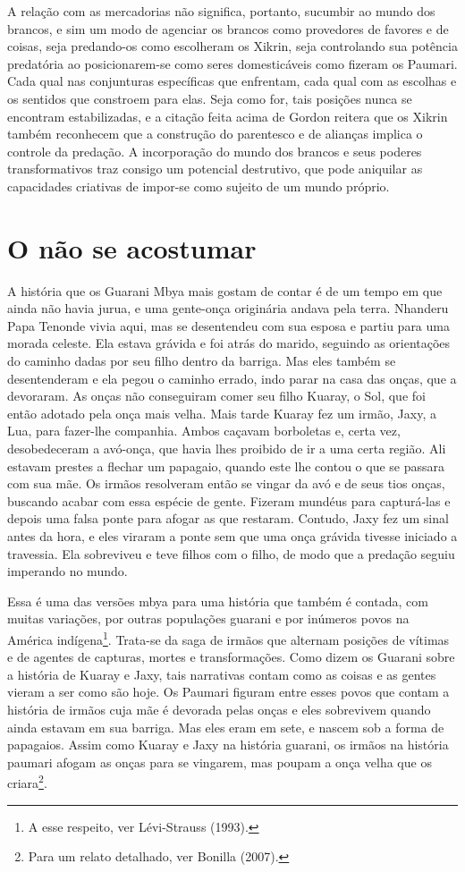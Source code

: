 A relação com as mercadorias não significa, portanto, sucumbir ao mundo
dos brancos, e sim um modo de agenciar os brancos como provedores de
favores e de coisas, seja predando-os como escolheram os Xikrin, seja
controlando sua potência predatória ao posicionarem-se como seres
domesticáveis como fizeram os Paumari. Cada qual nas conjunturas
específicas que enfrentam, cada qual com as escolhas e os sentidos que
constroem para elas. Seja como for, tais posições nunca se encontram
estabilizadas, e a citação feita acima de Gordon reitera que os Xikrin
também reconhecem que a construção do parentesco e de alianças implica
o controle da predação. A incorporação do mundo dos brancos e seus
poderes transformativos traz consigo um potencial destrutivo, que pode
aniquilar as capacidades criativas de impor-se como sujeito de um mundo
próprio.

\section{O não se acostumar}

A história que os Guarani Mbya mais gostam de contar é de um tempo em
que ainda não havia jurua, e uma gente-onça originária andava pela
terra. Nhanderu Papa Tenonde vivia aqui, mas se desentendeu com sua
esposa e partiu para uma morada celeste. Ela estava grávida e foi atrás
do marido, seguindo as orientações do caminho dadas por seu filho
dentro da barriga. Mas eles também se desentenderam e ela pegou o
caminho errado, indo parar na casa das onças, que a devoraram. As onças
não conseguiram comer seu filho Kuaray, o Sol, que foi então adotado
pela onça mais velha. Mais tarde Kuaray fez um irmão, Jaxy, a Lua, para
fazer-lhe companhia. Ambos caçavam borboletas e, certa vez,
desobedeceram a avó-onça, que havia lhes proibido de ir a uma certa
região. Ali estavam prestes a flechar um papagaio, quando este lhe
contou o que se passara com sua mãe. Os irmãos resolveram então se
vingar da avó e de seus tios onças, buscando acabar com essa espécie de
gente. Fizeram mundéus para capturá-las e depois uma falsa ponte para
afogar as que restaram. Contudo, Jaxy fez um sinal antes da hora, e
eles viraram a ponte sem que uma onça grávida tivesse iniciado a
travessia. Ela sobreviveu e teve filhos com o filho, de modo que a
predação seguiu imperando no mundo.

Essa é uma das versões mbya para uma história que também é contada, com
muitas variações, por outras populações guarani e por inúmeros povos na
América indígena\footnote{A esse respeito, ver Lévi-Strauss (1993).}.
Trata-se da saga de irmãos que alternam posições de vítimas e de
agentes de capturas, mortes e transformações. Como dizem os Guarani
sobre a história de Kuaray e Jaxy, tais narrativas contam como as
coisas e as gentes vieram a ser como são hoje. Os Paumari figuram entre
esses povos que contam a história de irmãos cuja mãe é devorada pelas
onças e eles sobrevivem quando ainda estavam em sua barriga. Mas eles
eram em sete, e nascem sob a forma de papagaios. Assim como Kuaray e
Jaxy na história guarani, os irmãos na história paumari afogam as onças
para se vingarem, mas poupam a onça velha que os criara\footnote{Para
um relato detalhado, ver Bonilla (2007).}.

